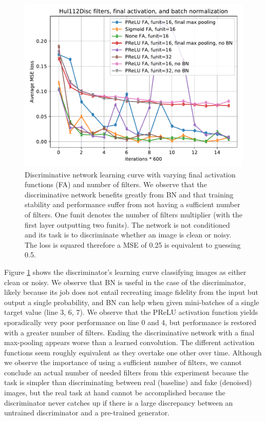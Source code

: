 \begin{figure}[!htbp]
\centering
\includegraphics[width=1\linewidth]{gfx/graphs/hul112disc-activ.pdf}
\caption[Discriminative network learning curve with different final activation functions and number of filters]{Discriminative network learning curve with varying final activation functions (FA) and number of filters. We observe that the discriminative network benefits greatly from \ac{BN} and that training stability and performance suffer from not having a sufficient number of filters. One funit denotes the number of filters multiplier (with the first layer outputting two funits). The network is not conditioned and its task is to discriminate whether an image is clean or noisy. The loss is squared therefore a \ac{MSE} of 0.25 is equivalent to guessing 0.5.}
\label{fig:hul112disc-activ}
\end{figure}

Figure \ref{fig:hul112disc-activ} shows the discriminator's learning curve classifying images as either clean or noisy. We observe that \acl{BN} is useful in the case of the discriminator, likely because its job does not entail recreating image fidelity from the input but output a single probability, and \acl{BN} can help when given mini-batches of a single target value (line 3, 6, 7). We observe that the \ac{PReLU} activation function yields sporadically very poor performance on line 0 and 4, but performance is restored with a greater number of filters. Ending the discriminative network with a final max-pooling appears worse than a learned convolution. The different activation functions seem roughly equivalent as they overtake one other over time. Although we observe the importance of using a sufficient number of filters, we cannot conclude an actual number of needed filters from this experiment because the task is simpler than discriminating between real (baseline) and fake (denoised) images, but the real task at hand cannot be accomplished because the discriminator never catches up if there is a large discrepancy between an untrained discriminator and a pre-trained generator.

